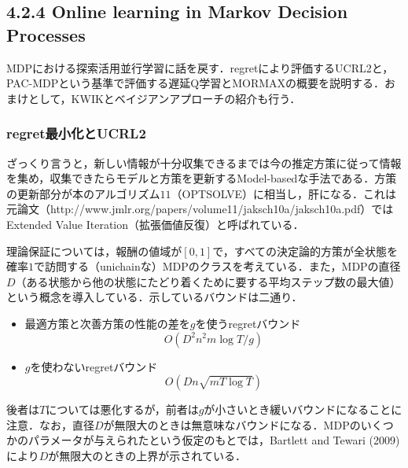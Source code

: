 \documentclass{jsarticle}
\begin{document}
\subsection*{4.2.4 Online learning in Markov Decision Processes}
MDPにおける探索活用並行学習に話を戻す．regretにより評価するUCRL2と，PAC-MDPという基準で評価する遅延Q学習とMORMAXの概要を説明する．おまけとして，KWIKとベイジアンアプローチの紹介も行う．

\subsubsection*{regret最小化とUCRL2}
ざっくり言うと，新しい情報が十分収集できるまでは今の推定方策に従って情報を集め，収集できたらモデルと方策を更新するModel-basedな手法である．方策の更新部分が本のアルゴリズム$11$（OPTSOLVE）に相当し，肝になる．これは元論文（http://www.jmlr.org/papers/volume11/jaksch10a/jaksch10a.pdf）ではExtended Value Iteration（拡張価値反復）と呼ばれている．

理論保証については，報酬の値域が$[0,1]$で，すべての決定論的方策が全状態を確率$1$で訪問する（unichainな）MDPのクラスを考えている．また，MDPの直径$D$（ある状態から他の状態にたどり着くために要する平均ステップ数の最大値）という概念を導入している．示しているバウンドは二通り．
\begin{itemize}
\item{最適方策と次善方策の性能の差を$g$を使うregretバウンド\\}
\[
O(D^2n^2m\log T/g)
\]
\item{$g$を使わないregretバウンド\\}
\[
O(Dn\sqrt{mT\log T})
\]
\end{itemize}
後者は$T$については悪化するが，前者は$g$が小さいとき緩いバウンドになることに注意．なお，直径$D$が無限大のときは無意味なバウンドになる．MDPのいくつかのパラメータが与えられたという仮定のもとでは，Bartlett and Tewari (2009) により$D$が無限大のときの上界が示されている．
\end{document}
